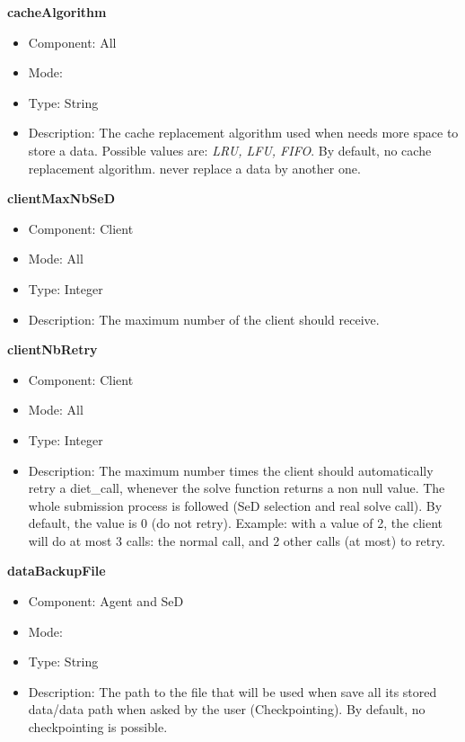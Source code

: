 \begin{description}
\item{\bf{cacheAlgorithm}}
  \begin{itemize}
  \item Component: All
  \item Mode: \dagda
  \item Type: String
  \item Description: The cache replacement algorithm used when \dagda needs more space
to store a data. Possible values are: \textit{LRU, LFU, FIFO}. By default, 
no cache replacement algorithm. \dagda never replace a data by
another one.
  \end{itemize}

\item{\bf{clientMaxNbSeD}}
  \begin{itemize}
  \item Component: Client
  \item Mode: All
  \item Type: Integer
  \item Description: The maximum number of \sed the client should receive.
  \end{itemize}


\item{\bf{clientNbRetry}}
  \begin{itemize}
  \item Component: Client
  \item Mode: All
  \item Type: Integer
  \item Description: The maximum number times the client should automatically
    retry a diet\_call, whenever the solve function returns a non null value. The
    whole submission process is followed (SeD selection and real solve call). By
    default, the value is 0 (do not retry). Example: with a value of 2, the client
    will do at most 3 calls: the normal call, and 2 other calls (at most) to
    retry.
  \end{itemize}

\item{\bf{dataBackupFile}}
  \begin{itemize}
  \item Component: Agent and SeD
  \item Mode: \dagda
  \item Type: String
  \item Description: The path to the file that will be used when \dagda save all its
stored data/data path when asked by the user (Checkpointing). By default, no
checkpointing is possible.
  \end{itemize}


\end{description}
